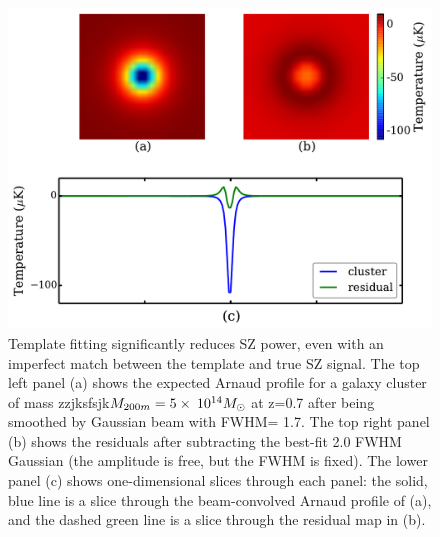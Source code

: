 {\begin{figure}
\includegraphics[width=\linewidth]{figs/template_fitting.pdf}
 \caption{Template fitting significantly reduces SZ power, even with an imperfect match between the template and true SZ signal. 
The top left panel (a) shows the expected Arnaud profile for a galaxy cluster of mass zzjksfsjk$M_{200m} = 5 \times \: 10^{14}M_{\odot}$ at z=0.7 after being smoothed by Gaussian beam with FWHM= 1\arcmin.7.
The top right panel (b) shows the residuals after subtracting the best-fit 2\arcmin.0 FWHM Gaussian (the amplitude is free, but the FWHM is fixed). 
The lower panel (c) shows one-dimensional slices through each panel: the solid, blue line is a slice through the beam-convolved Arnaud profile of (a), and the dashed green line is a slice through the residual map in (b). 
 } 
\label{fig:residual}
\end{figure}
}\fi